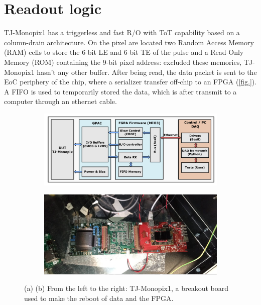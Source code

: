\section{Readout logic}
    TJ-Monopix1 has a triggerless and fast R/O with ToT capability based on a column-drain architecture.      
    On the pixel are located two Random Access Memory (RAM) cells to store the 6-bit LE and 6-bit TE of the pulse and a Read-Only Memory (ROM) containing the 9-bit pixel address: excluded these memories, TJ-Monopix1 hasn't any other buffer.
    After being read, the data packet is sent to the EoC periphery of the chip, where a serializer transfer off-chip to an FPGA (\ref{fig.}). A FIFO is used to temporarily stored the data, which is after transmit to a computer through an ethernet cable.  
    \begin{figure}
        \begin{subfigure}{.5\textwidth}
        \centering
        \includegraphics[width=.98\linewidth]{figures/Monopix1/schematic_boards.png}
        \end{subfigure}%
        \begin{subfigure}{.5\textwidth}
        \centering
        \includegraphics[width=.98\linewidth]{figures/Monopix1/monopix1_front.jpeg}
        \end{subfigure}
        \caption{(a) (b) From the left to the right: TJ-Monopix1, a breakout board used to make the reboot of data and the FPGA. }
        \label{fig:}
     \end{figure} 
  

